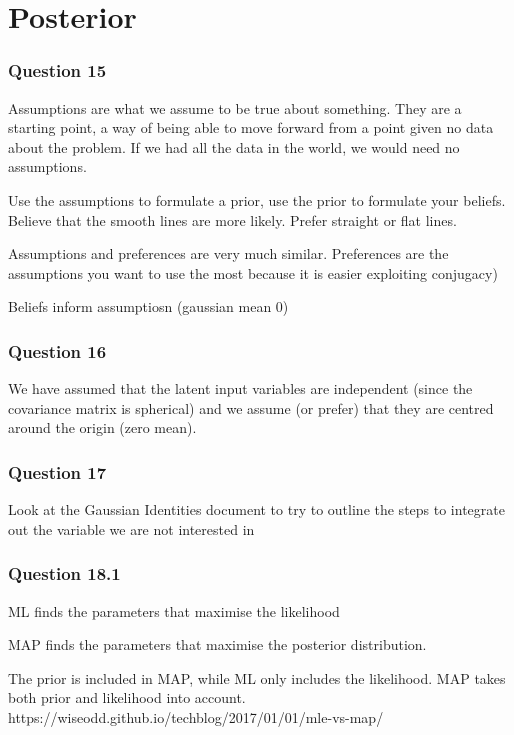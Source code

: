 \documentclass[10pt, a4paper, twocolumn]{article} %
\begin{document}
\section{Posterior}

\subsubsection*{Question 15}

Assumptions are what we assume to be true about something. They are a starting point, a way of being able to move forward from a point given no data about the problem. If we had all the data in the world, we would need no assumptions.

Use the assumptions to formulate a prior, use the prior to formulate your beliefs. Believe that the smooth lines are more likely. Prefer straight or flat lines.

Assumptions and preferences are very much similar. Preferences are the assumptions you want to use the most because it is easier exploiting conjugacy)

Beliefs inform assumptiosn (gaussian mean 0)

\subsubsection*{Question 16}

We have assumed that the latent input variables are independent (since the covariance matrix is spherical) and we assume (or prefer) that they are centred around the origin (zero mean).

\subsubsection*{Question 17}

Look at the Gaussian Identities document to try to outline the steps to integrate out the variable we are not interested in

\subsubsection*{Question 18.1}

ML finds the parameters that maximise the likelihood

MAP finds the parameters that maximise the posterior distribution.

The prior is included in MAP, while ML only includes the likelihood. MAP takes both prior and likelihood into account.
https://wiseodd.github.io/techblog/2017/01/01/mle-vs-map/
\end{document}
